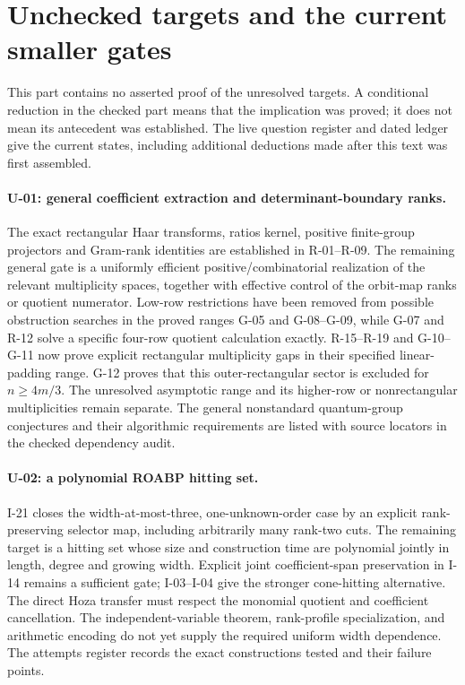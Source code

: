 \section{Unchecked targets and the current smaller gates}

This part contains no asserted proof of the unresolved targets. A conditional reduction in the checked part means that the implication was proved; it does not mean its antecedent was established. The live question register and dated ledger give the current states, including additional deductions made after this text was first assembled.

\paragraph{U-01: general coefficient extraction and determinant-boundary ranks.}
The exact rectangular Haar transforms, ratios kernel, positive finite-group projectors and Gram-rank identities are established in R-01--R-09. The remaining general gate is a uniformly efficient positive/combinatorial realization of the relevant multiplicity spaces, together with effective control of the orbit-map ranks or quotient numerator. Low-row restrictions have been removed from possible obstruction searches in the proved ranges G-05 and G-08--G-09, while G-07 and R-12 solve a specific four-row quotient calculation exactly. R-15--R-19 and G-10--G-11 now prove explicit rectangular multiplicity gaps in their specified linear-padding range. G-12 proves that this outer-rectangular sector is excluded for $n\geq4m/3$. The unresolved asymptotic range and its higher-row or nonrectangular multiplicities remain separate. The general nonstandard quantum-group conjectures and their algorithmic requirements are listed with source locators in the checked dependency audit.

\paragraph{U-02: a polynomial ROABP hitting set.}
I-21 closes the width-at-most-three, one-unknown-order case by an explicit rank-preserving selector map, including arbitrarily many rank-two cuts. The remaining target is a hitting set whose size and construction time are polynomial jointly in length, degree and growing width. Explicit joint coefficient-span preservation in I-14 remains a sufficient gate; I-03--I-04 give the stronger cone-hitting alternative. The direct Hoza transfer must respect the monomial quotient and coefficient cancellation. The independent-variable theorem, rank-profile specialization, and arithmetic encoding do not yet supply the required uniform width dependence. The attempts register records the exact constructions tested and their failure points.

